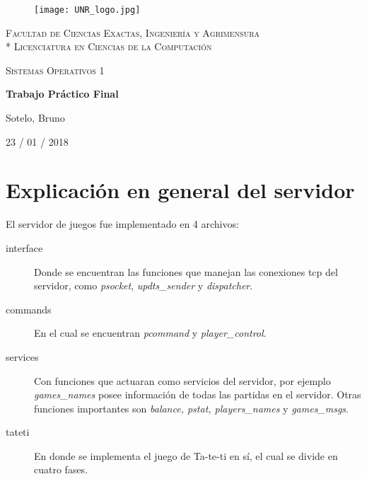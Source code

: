 \documentclass[a4paper]{report}
\begin{document}
\begin{titlepage}
\centering
\begin{figure}[H]
    \begin{center}
        \texttt{[image: UNR\_logo.jpg]}
    \end{center}
\end{figure}
{\scshape\large Facultad de Ciencias Exactas, Ingenier\'ia y Agrimensura\\*
                 Licenciatura en Ciencias de la Computaci\'on\par}
\vspace{5cm}
{\scshape\LARGE Sistemas Operativos 1 \par}
{\huge\bfseries Trabajo Pr\'actico Final \par}
\vspace{3cm}
{\Large Sotelo, Bruno\par}
\vfill
{\large 23 / 01 / 2018 \par}
\end{titlepage}


\section*{Explicación en general del servidor}

El servidor de juegos fue implementado en 4 archivos:
\begin{description}
	\item[interface] Donde se encuentran las funciones que manejan
		las conexiones tcp del servidor, como \textit{psocket}, 
		\textit{updts\_sender} y \textit{dispatcher}.
	\item[commands] En el cual se encuentran \textit{pcommand} y 
		\textit{player\_control}.
	\item[services] Con funciones que actuaran como servicios
		del servidor, por ejemplo \textit{games\_names} posee información
		de todas las partidas en el servidor. Otras funciones importantes
		son \textit{balance, pstat, players\_names} y \textit{games\_msgs}.
	\item[tateti] En donde se implementa el juego de Ta-te-ti en sí, el
		cual se divide en cuatro fases.
\end{description}
\end{document}
